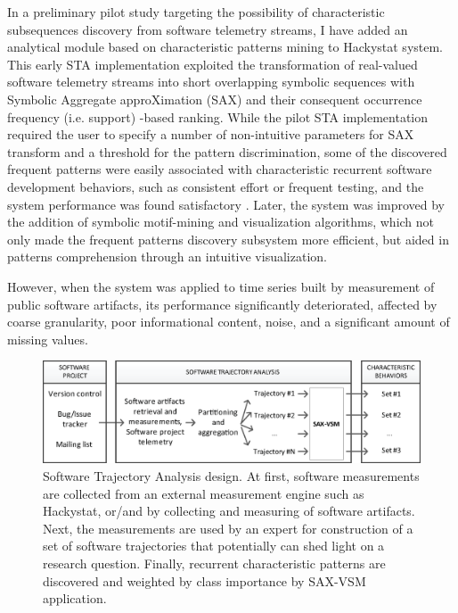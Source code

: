 In a preliminary pilot study targeting the possibility of characteristic subsequences discovery from 
software telemetry streams, I have added an analytical module based on characteristic patterns mining 
to Hackystat system. This early STA implementation exploited the transformation of real-valued software 
telemetry streams into short overlapping symbolic sequences with Symbolic Aggregate approXimation 
(SAX) \cite{sax} and their consequent occurrence frequency (i.e. support) -based ranking. 
While the pilot STA implementation required the user to specify a number of non-intuitive parameters for 
SAX transform and a threshold for the pattern discrimination, some of the discovered frequent patterns 
were easily associated with characteristic recurrent software development behaviors, such as consistent 
effort or frequent testing, and the system performance was found satisfactory \cite{csdl2-10-09}.
Later, the system was improved by the addition of symbolic motif-mining and visualization algorithms, 
which not only made the frequent patterns discovery subsystem more efficient, 
but aided in patterns comprehension through an intuitive visualization. 

However, when the system was applied to time series built by measurement of public software artifacts, 
its performance significantly deteriorated, affected by coarse granularity, poor informational content,
noise, and a significant amount of missing values. 

\begin{figure}[t!]
   \centering
   \includegraphics[width=150mm]{figures/Overview2.eps}
   \caption{Software Trajectory Analysis design. 
    At first, software measurements are collected from an external measurement engine such as Hackystat, 
    or/and by collecting and measuring of software artifacts.
    Next, the measurements are used by an expert for construction of a set of software trajectories that 
    potentially can shed light on a research question. 
    Finally, recurrent characteristic patterns are discovered and weighted by class importance by SAX-VSM application.}
   \label{fig:sta-overview}
\end{figure}

